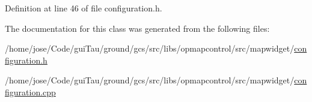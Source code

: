 Definition at line 46 of file configuration.\-h.



The documentation for this class was generated from the following files\-:\begin{DoxyCompactItemize}
\item 
/home/jose/\-Code/gui\-Tau/ground/gcs/src/libs/opmapcontrol/src/mapwidget/\hyperlink{configuration_8h}{configuration.\-h}\item 
/home/jose/\-Code/gui\-Tau/ground/gcs/src/libs/opmapcontrol/src/mapwidget/\hyperlink{configuration_8cpp}{configuration.\-cpp}\end{DoxyCompactItemize}
